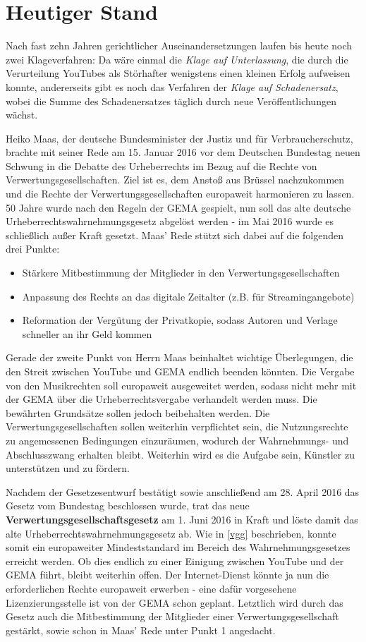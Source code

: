 \section{Heutiger Stand}
Nach fast zehn Jahren gerichtlicher Auseinandersetzungen laufen bis heute noch zwei Klageverfahren: Da wäre einmal die \textit{Klage auf Unterlassung}, die durch die Verurteilung YouTubes als Störhafter wenigstens einen kleinen Erfolg aufweisen konnte, andererseits gibt es noch das Verfahren der \textit{Klage auf Schadenersatz}, wobei die Summe des Schadenersatzes täglich durch neue Veröffentlichungen wächst.

Heiko Maas, der deutsche Bundesminister der Justiz und für Verbraucherschutz, brachte mit seiner Rede am 15. Januar 2016 vor dem Deutschen Bundestag neuen Schwung in die Debatte des Urheberrechts im Bezug auf die Rechte von Verwertungsgesellschaften. Ziel ist es, dem Anstoß aus Brüssel nachzukommen und die Rechte der Verwertungsgesellschaften europaweit harmonieren zu lassen. 50 Jahre wurde nach den Regeln der GEMA gespielt, nun soll das alte deutsche Urheberrechtswahrnehmungsgesetz abgelöst werden - im Mai 2016 wurde es schließlich außer Kraft gesetzt. Maas' Rede stützt sich dabei auf die folgenden drei Punkte:

\begin{itemize}
\item Stärkere Mitbestimmung der Mitglieder in den Verwertungsgesellschaften
\item Anpassung des Rechts an das digitale Zeitalter (z.B. für Streamingangebote)
\item Reformation der Vergütung der Privatkopie, sodass Autoren und Verlage schneller an ihr Geld kommen
\end{itemize}

Gerade der zweite Punkt von Herrn Maas beinhaltet wichtige Überlegungen, die den Streit zwischen YouTube und GEMA endlich beenden könnten. Die Vergabe von den Musikrechten soll europaweit ausgeweitet werden, sodass nicht mehr mit der GEMA über die Urheberrechtsvergabe verhandelt werden muss. Die bewährten Grundsätze sollen jedoch beibehalten werden. Die Verwertungsgesellschaften sollen weiterhin verpflichtet sein, die Nutzungsrechte zu angemessenen Bedingungen einzuräumen, wodurch der Wahrnehmungs- und Abschlusszwang erhalten bleibt. Weiterhin wird es die Aufgabe sein, Künstler zu unterstützen und zu fördern. 

Nachdem der Gesetzesentwurf bestätigt sowie anschließend am 28. April 2016 das Gesetz vom Bundestag beschlossen wurde, trat das neue \textbf{Verwertungsgesellschaftsgesetz} am 1. Juni 2016 in Kraft und löste damit das alte Urheberrechtswahrnehmungsgesetz ab. Wie in \vref{vgg} beschrieben, konnte somit ein europaweiter Mindeststandard im Bereich des Wahrnehmungsgesetzes erreicht werden. Ob dies endlich zu einer Einigung zwischen YouTube und der GEMA führt, bleibt weiterhin offen. Der Internet-Dienst könnte ja nun die erforderlichen Rechte europaweit erwerben - eine dafür vorgesehene Lizenzierungsstelle ist von der GEMA schon geplant. Letztlich wird durch das Gesetz auch die Mitbestimmung der Mitglieder einer Verwertungsgesellschaft gestärkt, sowie schon in Maas' Rede unter Punkt 1 angedacht.
